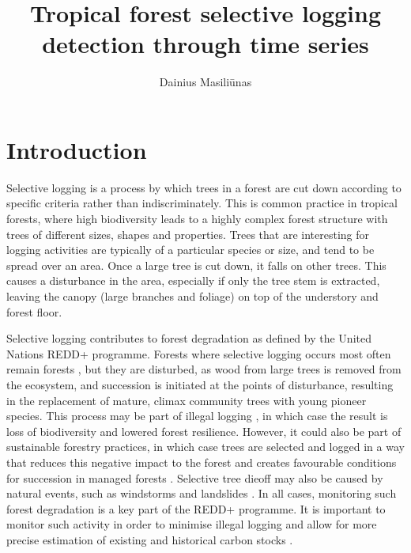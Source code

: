 \documentclass[a4paper,10pt]{article}
\title{Tropical forest selective logging detection through time series}
\author{Dainius Masiliūnas}
\newcommand{\redd}{\ac{REDD+}}
\begin{document}
\maketitle

\section{Introduction}

Selective logging is a process by which trees in a forest are cut down according to specific criteria rather than indiscriminately. This is common practice in tropical forests, where high biodiversity leads to a highly complex forest structure with trees of different sizes, shapes and properties. Trees that are interesting for logging activities are typically of a particular species or size, and tend to be spread over an area. Once a large tree is cut down, it falls on other trees. This causes a disturbance in the area, especially if only the tree stem is extracted, leaving the canopy (large branches and foliage) on top of the understory and forest floor.

Selective logging contributes to forest degradation as defined by the United Nations \redd{} programme. Forests where selective logging occurs most often remain forests \citep{asner_condition_2006}, but they are disturbed, as wood from large trees is removed from the ecosystem, and succession is initiated at the points of disturbance, resulting in the replacement of mature, climax community trees with young pioneer species. This process may be part of illegal logging \citep{rutishauser_rapid_2015}, in which case the result is loss of biodiversity and lowered forest resilience. However, it could also be part of sustainable forestry practices, in which case trees are selected and logged in a way that reduces this negative impact to the forest and creates favourable conditions for succession in managed forests \citep{west_forest_2014, keller_4._2004}. Selective tree dieoff may also be caused by natural events, such as windstorms and landslides \citep{frolking_forest_2009}. In all cases, monitoring such forest degradation is a key part of the \redd{} programme. It is important to monitor such activity in order to minimise illegal logging and allow for more precise estimation of existing and historical carbon stocks \citep{piponiot_carbon_2016, pinard_simulated_2000}.
\end{document}
